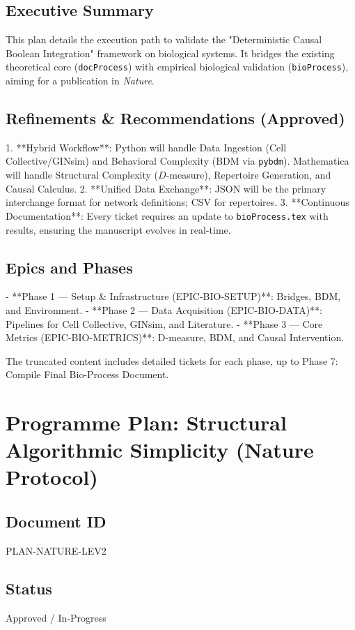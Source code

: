 \documentclass{article}
\begin{document}
\subsection{Executive Summary}
This plan details the execution path to validate the "Deterministic Causal Boolean Integration" framework on biological systems. It bridges the existing theoretical core (\texttt{docProcess}) with empirical biological validation (\texttt{bioProcess}), aiming for a publication in \textit{Nature}.

\subsection{Refinements \& Recommendations (Approved)}
1.  **Hybrid Workflow**: Python will handle Data Ingestion (Cell Collective/GINsim) and Behavioral Complexity (BDM via \texttt{pybdm}). Mathematica will handle Structural Complexity ($D$-measure), Repertoire Generation, and Causal Calculus.
2.  **Unified Data Exchange**: JSON will be the primary interchange format for network definitions; CSV for repertoires.
3.  **Continuous Documentation**: Every ticket requires an update to \texttt{bioProcess.tex} with results, ensuring the manuscript evolves in real-time.

\subsection{Epics and Phases}
-   **Phase 1 — Setup \& Infrastructure (EPIC-BIO-SETUP)**: Bridges, BDM, and Environment.
-   **Phase 2 — Data Acquisition (EPIC-BIO-DATA)**: Pipelines for Cell Collective, GINsim, and Literature.
-   **Phase 3 — Core Metrics (EPIC-BIO-METRICS)**: D-measure, BDM, and Causal Intervention.

The truncated content includes detailed tickets for each phase, up to Phase 7: Compile Final Bio-Process Document.

\section{Programme Plan: Structural Algorithmic Simplicity (Nature Protocol)}
\subsection{Document ID}
PLAN-NATURE-LEV2

\subsection{Status}
Approved / In-Progress
\end{document}
